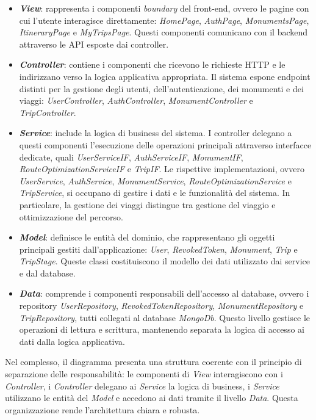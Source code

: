 \begin{itemize}
    \item \textbf{\textit{View}}: rappresenta i componenti \textit{boundary} del front-end, ovvero le pagine con cui l’utente interagisce direttamente: \textit{HomePage}, \textit{AuthPage}, \textit{MonumentsPage}, \textit{ItineraryPage} e \textit{MyTripsPage}. Questi componenti comunicano con il backend attraverso le API esposte dai controller.
    
    \item \textbf{\textit{Controller}}: contiene i componenti che ricevono le richieste HTTP e le indirizzano verso la logica applicativa appropriata. Il sistema espone endpoint distinti per la gestione degli utenti, dell’autenticazione, dei monumenti e dei viaggi: \textit{UserController}, \textit{AuthController}, \textit{MonumentController} e \textit{TripController}.
    
    \item \textbf{\textit{Service}}: include la logica di business del sistema. I controller delegano a questi componenti l’esecuzione delle operazioni principali attraverso interfacce dedicate, quali \textit{UserServiceIF}, \textit{AuthServiceIF}, \textit{MonumentIF}, \textit{RouteOptimizationServiceIF} e \textit{TripIF}. Le rispettive implementazioni, ovvero \textit{UserService}, \textit{AuthService}, \textit{MonumentService}, \textit{RouteOptimizationService} e \textit{TripService}, si occupano di gestire i dati e le funzionalità del sistema. In particolare, la gestione dei viaggi distingue tra gestione del viaggio e ottimizzazione del percorso.
    
    \item \textbf{\textit{Model}}: definisce le entità del dominio, che rappresentano gli oggetti principali gestiti dall’applicazione: \textit{User}, \textit{RevokedToken}, \textit{Monument}, \textit{Trip} e \textit{TripStage}. Queste classi costituiscono il modello dei dati utilizzato dai service e dal database.
    
    \item \textbf{\textit{Data}}: comprende i componenti responsabili dell’accesso al database, ovvero i repository \textit{UserRepository}, \textit{RevokedTokenRepository}, \textit{MonumentRepository} e \textit{TripRepository}, tutti collegati al database \textit{MongoDb}. Questo livello gestisce le operazioni di lettura e scrittura, mantenendo separata la logica di accesso ai dati dalla logica applicativa.
\end{itemize}

Nel complesso, il diagramma presenta una struttura coerente con il principio di separazione delle responsabilità: le componenti di \textit{View} interagiscono con i \textit{Controller}, i \textit{Controller} delegano ai \textit{Service} la logica di business, i \textit{Service} utilizzano le entità del \textit{Model} e accedono ai dati tramite il livello \textit{Data}. Questa organizzazione rende l’architettura chiara e robusta.